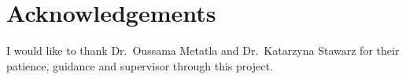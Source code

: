 
\section*{Acknowledgements}
I would like to thank Dr.~Oussama Metatla and Dr.~Katarzyna Stawarz for their patience, guidance and supervisor through this project.
